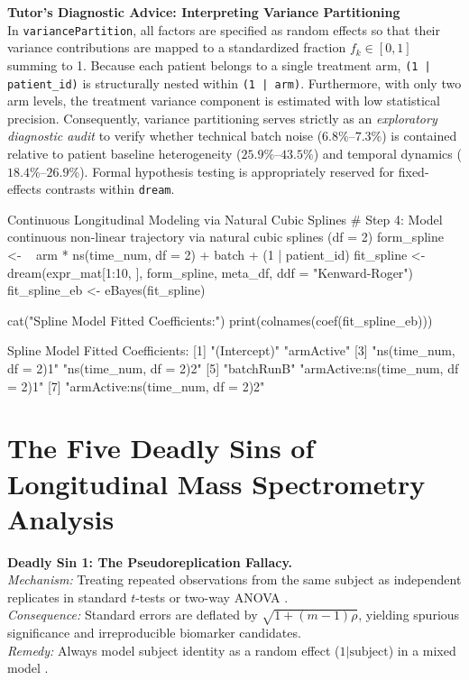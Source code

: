\documentclass[11pt,twoside,openright]{book}
\begin{document}
\begin{notebox}
\textbf{Tutor's Diagnostic Advice: Interpreting Variance Partitioning}\\
In \texttt{variancePartition}, all factors are specified as random effects so that their variance contributions are mapped to a standardized fraction $f_k \in [0, 1]$ summing to 1. Because each patient belongs to a single treatment arm, \texttt{(1 | patient\_id)} is structurally nested within \texttt{(1 | arm)}. Furthermore, with only two arm levels, the treatment variance component is estimated with low statistical precision. Consequently, variance partitioning serves strictly as an \textit{exploratory diagnostic audit} to verify whether technical batch noise ($6.8\%\text{--}7.3\%$) is contained relative to patient baseline heterogeneity ($25.9\%\text{--}43.5\%$) and temporal dynamics ($18.4\%\text{--}26.9\%$). Formal hypothesis testing is appropriately reserved for fixed-effects contrasts within \texttt{dream}.
\end{notebox}

\begin{rchunk}{Continuous Longitudinal Modeling via Natural Cubic Splines}
# Step 4: Model continuous non-linear trajectory via natural cubic splines (df = 2)
form_spline <- ~ arm * ns(time_num, df = 2) + batch + (1 | patient_id)
fit_spline <- dream(expr_mat[1:10, ], form_spline, meta_df, ddf = "Kenward-Roger")
fit_spline_eb <- eBayes(fit_spline)

cat("Spline Model Fitted Coefficients:\n")
print(colnames(coef(fit_spline_eb)))
\end{rchunk}

\begin{routput}
Spline Model Fitted Coefficients:
{}[1] "(Intercept)"                     "armActive"                      
{}[3] "ns(time\_num, df = 2)1"           "ns(time\_num, df = 2)2"          
{}[5] "batchRunB"                       "armActive:ns(time\_num, df = 2)1"
{}[7] "armActive:ns(time\_num, df = 2)2"
\end{routput}

\section{The Five Deadly Sins of Longitudinal Mass Spectrometry Analysis}

\begin{pitfallbox}
\textbf{Deadly Sin 1: The Pseudoreplication Fallacy.}\\
\textit{Mechanism:} Treating repeated observations from the same subject as independent replicates in standard $t$-tests or two-way ANOVA \cite{hurlbert1984pseudoreplication}.\\
\textit{Consequence:} Standard errors are deflated by $\sqrt{1 + (m-1)\rho}$, yielding spurious significance and irreproducible biomarker candidates.\\
\textit{Remedy:} Always model subject identity as a random effect ($1 | \text{subject}$) in a mixed model \cite{pinheiro2000mixed}.
\end{pitfallbox}
\end{document}

